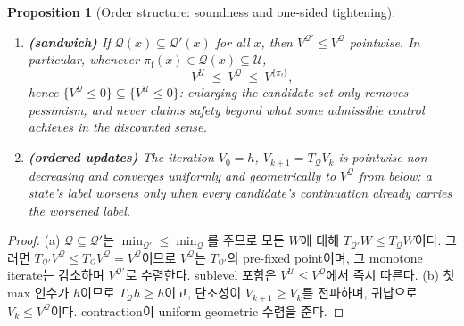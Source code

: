 \documentclass[11pt]{article}
\theoremstyle{plain}
\newtheorem{proposition}[theorem]{Proposition}
\theoremstyle{definition}
\theoremstyle{remark}
\newcommand{\calU}{\mathcal{U}}
\newcommand{\calQ}{\mathcal{Q}}
\begin{document}
\begin{proposition}[Order structure: soundness and one-sided tightening]\label{prop:label-order}
\begin{enumerate}[label=(\alph*)]
  \item \textbf{(sandwich)} If $\calQ(x)\subseteq\calQ'(x)$ for all $x$, then
  $V^{\calQ'}\le V^{\calQ}$ pointwise. In particular, whenever
  $\pi_{\mathrm f}(x)\in\calQ(x)\subseteq\calU$,
  \begin{equation}
  V^{\calU}\ \le\ V^{\calQ}\ \le\ V^{\{\pi_{\mathrm f}\}},
  \end{equation}
  hence $\{V^{\calQ}\le0\}\subseteq\{V^{\calU}\le0\}$: enlarging the candidate set only
  \emph{removes} pessimism, and never claims safety beyond what some admissible control
  achieves in the discounted sense.
  \item \textbf{(ordered updates)} The iteration $V_0=h$, $V_{k+1}=T_{\calQ}V_k$ is pointwise
  non-decreasing and converges uniformly and geometrically to $V^{\calQ}$ from below: a state's
  label worsens only when every candidate's continuation already carries the worsened label.
\end{enumerate}
\end{proposition}
\begin{proof}
(a) $\calQ\subseteq\calQ'$는 $\min_{\calQ'}\le\min_{\calQ}$를 주므로 모든 $W$에 대해
$T_{\calQ'}W\le T_{\calQ}W$이다. 그러면 $T_{\calQ'}V^{\calQ}\le T_{\calQ}V^{\calQ}=V^{\calQ}$이므로
$V^{\calQ}$는 $T_{\calQ'}$의 pre-fixed point이며, 그 monotone iterate는 감소하며 $V^{\calQ'}$로
수렴한다. sublevel 포함은 $V^{\calU}\le V^{\calQ}$에서 즉시 따른다. (b) 첫 max 인수가 $h$이므로
$T_{\calQ}h\ge h$이고, 단조성이 $V_{k+1}\ge V_k$를 전파하며, 귀납으로 $V_k\le V^{\calQ}$이다.
contraction이 uniform geometric 수렴을 준다.
\end{proof}
\end{document}
